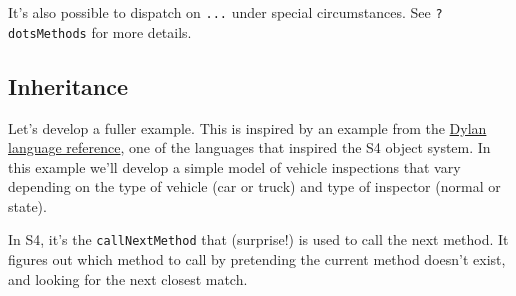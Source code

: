 \begin{Shaded}
\begin{Highlighting}[]
\StringTok{ }\NormalTok{(}\NormalTok{(} \NormalTok{), } \NormalTok{)}

\NormalTok{(}\NormalTok{)}
\NormalTok{(}\NormalTok{, }\NormalTok{(}\NormalTok{), }\NormalTok{)}
    
    
\NormalTok{(}\NormalTok{, }\NormalTok{(} \NormalTok{, } \NormalTok{), }
  \NormalTok{(}\NormalTok{(}\OperatorTok{$}\OperatorTok{+}\StringTok{ } \NormalTok{)}
\NormalTok{\})}
\OperatorTok{+}\StringTok{ }
\end{Highlighting}
\end{Shaded}

It's also possible to dispatch on \texttt{...} under special
circumstances. See \texttt{?dotsMethods} for more details.

\hypertarget{inheritance}{%
\subsection{Inheritance}\label{inheritance}}

Let's develop a fuller example. This is inspired by an example from the
\href{http://opendylan.org/documentation/intro-dylan/index.html}{Dylan
language reference}, one of the languages that inspired the S4 object
system. In this example we'll develop a simple model of vehicle
inspections that vary depending on the type of vehicle (car or truck)
and type of inspector (normal or state).

In S4, it's the \texttt{callNextMethod} that (surprise!) is used to call
the next method. It figures out which method to call by pretending the
current method doesn't exist, and looking for the next closest match.

